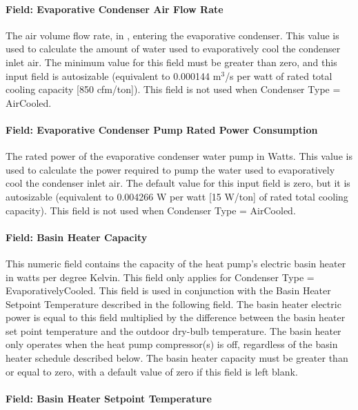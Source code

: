 \paragraph{Field: Evaporative Condenser Air Flow Rate}\label{field-evaporative-condenser-air-flow-rate-000}

The air volume flow rate, in \si{\volumeFlowRate}, entering the evaporative condenser. This value is used to calculate the amount of water used to evaporatively cool the condenser inlet air. The minimum value for this field must be greater than zero, and this input field is autosizable (equivalent to 0.000144 m\(^{3}\)/s per watt of rated total cooling capacity {[}850 cfm/ton{]}). This field is not used when Condenser Type = AirCooled.

\paragraph{Field: Evaporative Condenser Pump Rated Power Consumption}\label{field-evaporative-condenser-pump-rated-power-consumption-000}

The rated power of the evaporative condenser water pump in Watts. This value is used to calculate the power required to pump the water used to evaporatively cool the condenser inlet air. The default value for this input field is zero, but it is autosizable (equivalent to 0.004266 W per watt {[}15 W/ton{]} of rated total cooling capacity). This field is not used when Condenser Type = AirCooled.

\paragraph{Field: Basin Heater Capacity}\label{field-basin-heater-capacity-001}

This numeric field contains the capacity of the heat pump's electric basin heater in watts per degree Kelvin. This field only applies for Condenser Type = EvaporativelyCooled. This field is used in conjunction with the Basin Heater Setpoint Temperature described in the following field. The basin heater electric power is equal to this field multiplied by the difference between the basin heater set point temperature and the outdoor dry-bulb temperature. The basin heater only operates when the heat pump compressor(s) is off, regardless of the basin heater schedule described below. The basin heater capacity must be greater than or equal to zero, with a default value of zero if this field is left blank.

\paragraph{Field: Basin Heater Setpoint Temperature}\label{field-basin-heater-setpoint-temperature-001}

